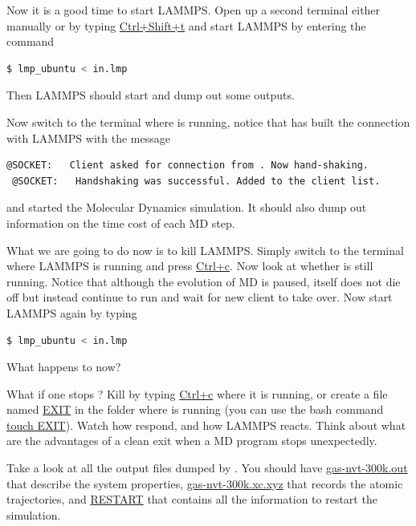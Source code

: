 \documentclass{article}
\begin{document}
\begin{Exercise}[label={basic},title={Molecular Dynamics simulations doing in a different way:  server and clients}]
\Question
Now it is a good time to start LAMMPS.
Open up a second terminal either manually or by typing \url{Ctrl+Shift+t}
and start LAMMPS by entering the command
\begin{lstlisting}[language=bash]
$ lmp_ubuntu < in.lmp
\end{lstlisting}
Then LAMMPS should start and dump out some outputs.

\Question
Now switch to the terminal where \ipi{} is running, notice that \ipi{} has built the connection with LAMMPS with the message
\begin{lstlisting}[language=sh]
 @SOCKET:   Client asked for connection from . Now hand-shaking.
 @SOCKET:   Handshaking was successful. Added to the client list.
\end{lstlisting}
and started the Molecular Dynamics simulation.
It should also dump out information on the time cost of each MD step.

\Question
What we are going to do now is to kill LAMMPS.
Simply switch to the terminal where LAMMPS is running and press \url{Ctrl+c}.
Now look at whether \ipi{} is still running.
Notice that although the evolution of MD is paused, \ipi{} itself does not die off but instead continue to run and wait for new client to take over.
Now start LAMMPS again by typing
\begin{lstlisting}[language=bash]
$ lmp_ubuntu < in.lmp
\end{lstlisting}
What happens to \ipi{} now?

\Question
What if one stops \ipi{}? 
Kill \ipi{} by typing \url{Ctrl+c} where it is running, or create a file named \url{EXIT} in the folder where \ipi{} is running
(you can use the bash command \url{touch EXIT}).
Watch how \ipi{} respond, and how LAMMPS reacts.
Think about what are the advantages of a clean exit when a MD program stops unexpectedly.

\Question
Take a look at all the output files dumped by \ipi{}.
You should have \url{gas-nvt-300k.out} that describe the system properties,
\url{gas-nvt-300k.xc.xyz} that records the atomic trajectories,
and \url{RESTART} that contains all the information to restart the simulation. 
\end{Exercise}
\end{document}
